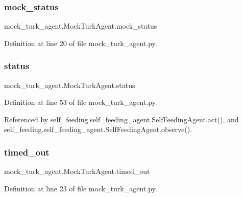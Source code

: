 \subsubsection{\texorpdfstring{mock\+\_\+status}{mock\_status}}
{\footnotesize\ttfamily mock\+\_\+turk\+\_\+agent.\+Mock\+Turk\+Agent.\+mock\+\_\+status}



Definition at line 20 of file mock\+\_\+turk\+\_\+agent.\+py.

\mbox{\label{classmock__turk__agent_1_1MockTurkAgent_a7832b915d19a906ebcdbc6bc81319059}} 
\subsubsection{\texorpdfstring{status}{status}}
{\footnotesize\ttfamily mock\+\_\+turk\+\_\+agent.\+Mock\+Turk\+Agent.\+status}



Definition at line 53 of file mock\+\_\+turk\+\_\+agent.\+py.



Referenced by self\+\_\+feeding.\+self\+\_\+feeding\+\_\+agent.\+Self\+Feeding\+Agent.\+act(), and self\+\_\+feeding.\+self\+\_\+feeding\+\_\+agent.\+Self\+Feeding\+Agent.\+observe().

\mbox{\label{classmock__turk__agent_1_1MockTurkAgent_a8481779cac127832fa6aa91bb92f4ffd}} 
\subsubsection{\texorpdfstring{timed\+\_\+out}{timed\_out}}
{\footnotesize\ttfamily mock\+\_\+turk\+\_\+agent.\+Mock\+Turk\+Agent.\+timed\+\_\+out}



Definition at line 23 of file mock\+\_\+turk\+\_\+agent.\+py.



